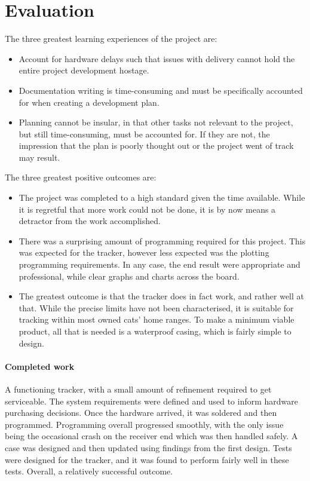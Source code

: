 \documentclass[11pt]{article}
\begin{document}
\section{Evaluation}
The three greatest learning experiences of the project are:
\begin{itemize}
    \item Account for hardware delays such that issues with delivery 
            cannot hold the entire project development hostage.
    \item Documentation writing is time-consuming and must be specifically 
            accounted for when creating a development plan. 
    \item Planning cannot be insular, in that other tasks not relevant 
            to the project, but still time-consuming, must be accounted for.
            If they are not, the impression that the plan is poorly thought out
            or the project went of track may result.
\end{itemize}
\medskip
The three greatest positive outcomes are:
\begin{itemize}
    \item The project was completed to a high standard given the time available. While it is regretful 
            that more work could not be done, it is by now means a detractor from the work accomplished.
    \item There was a surprising amount of programming required for this project. This was expected for 
            the tracker, however less expected was the plotting programming requirements. In any case, the 
            end result were appropriate and professional, while clear graphs and charts across the board. 
    \item The greatest outcome is that the tracker does in fact work, and rather well at that. While the 
            precise limits have not been characterised, it is suitable for tracking within most owned cats' 
            home ranges. To make a minimum viable product, all that is needed is a waterproof casing, 
            which is fairly simple to design. 
\end{itemize}

\paragraph{Completed work}
A functioning tracker, with a small amount of refinement required to get serviceable. 
The system requirements were defined and used to inform hardware purchasing decisions. Once the hardware 
arrived, it was soldered and then programmed. Programming overall progressed smoothly, with the only 
issue being the occasional crash on the receiver end which was then handled safely. 
A case was designed and then updated using findings from the first design. 
Tests were designed for the tracker, and it was found to perform fairly well in these tests. 
Overall, a relatively successful outcome.
\end{document}
